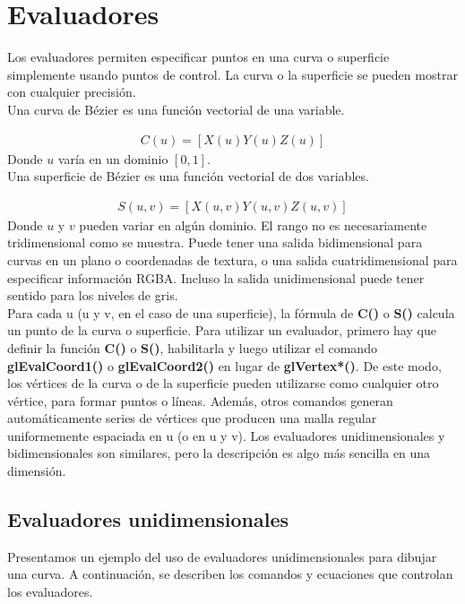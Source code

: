 \section{Evaluadores}
Los evaluadores permiten especificar puntos en una curva o superficie simplemente usando puntos de control. La curva o la superficie se pueden mostrar con cualquier precisión.\\

Una curva de Bézier es una función vectorial de una variable.

\begin{align*}
C\left(u\right)=[X\left(u\right)Y\left(u\right)Z\left(u\right)]
\end{align*}
Donde $u$ varía en un dominio $[0,1]$. \\

Una superficie de Bézier es una función vectorial de dos variables.

\begin{align*}
S\left(u,v\right)=[X\left(u,v\right)Y\left(u,v\right)Z\left(u,v\right)]
\end{align*}
Donde $u$ y $v$ pueden variar en algún dominio. El rango no es necesariamente tridimensional como se muestra. Puede tener una salida bidimensional para curvas en un plano o coordenadas de textura, o una salida cuatridimensional para especificar información RGBA. Incluso la salida unidimensional puede tener sentido para los niveles de gris.\\

Para cada u (u y v, en el caso de una superficie), la fórmula de  \textbf{C()} o \textbf{S()} calcula un punto de la curva o superficie. Para utilizar un evaluador, primero hay que definir la función \textbf{C()} o \textbf{S()}, habilitarla y luego utilizar el comando \textbf{glEvalCoord1()} o \textbf{glEvalCoord2()} en lugar de \textbf{glVertex*()}. De este modo, los vértices de la curva o de la superficie pueden utilizarse como cualquier otro vértice, para formar puntos o líneas. Además, otros comandos generan automáticamente series de vértices que producen una malla regular uniformemente espaciada en u (o en u y v). Los evaluadores unidimensionales y bidimensionales son similares, pero la descripción es algo más sencilla en una dimensión.
\subsection{Evaluadores unidimensionales}
Presentamos un ejemplo del uso de evaluadores unidimensionales para dibujar una curva. A continuación, se describen los comandos y ecuaciones que controlan los evaluadores.\\

